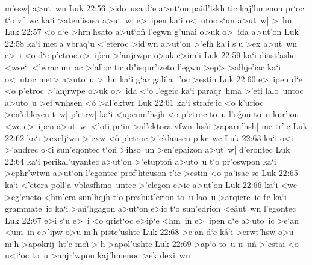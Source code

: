 m'esw|
a>ut~wn\bibvsend
\vs Luk 22:56
>ido~usa
d`e
a>ut`on
paid'iskh
tic
kaj'hmenon
pr`oc
t`o
vf~wc
ka`i
>aten'isasa
a>ut~w|
e>~ipen
ka`i
o<~utoc
s`un
a>ut~w|
>~hn\bibvsend
\vs Luk 22:57
<o
d`e
>hrn'hsato
a>ut`on\r{}
l'egwn
g'unai
o>uk
o>~ida
a>ut'on\bibvsend
\vs Luk 22:58
ka`i
met`a
vbraq`u
<'eteroc
>id`wn
a>ut`on
>'efh
ka`i
s`u
>ex
a>ut~wn
e>~i
<o
d`e
p'etroc
e>~i\r{p}en
>'anjrwpe
o>uk
e>im'i\bibvsend
\vs Luk 22:59
ka`i
diast'ashc
<wse`i
<'wrac
mi~ac
>'alloc
tic
di"isqur'izeto
l'egwn
>ep>
>alhje'iac
ka`i
o<~utoc
met>
a>uto~u
>~hn
ka`i
g`ar
galila~i'oc
>estin\bibvsend
\vs Luk 22:60
e>~ipen
d`e
<o
p'etroc
>'anjrwpe
o>uk
o>~ida
<`o
l'egeic
ka`i
paraqr~hma
>'eti
lalo~untoc
a>uto~u
>ef'wnhsen
<o\r{}
>al'ektwr\bibvsend
\vs Luk 22:61
ka`i
strafe`ic
<o
k'urioc
>en'ebleyen
t~w|
p'etrw|
ka`i
<upemn'hsjh
<o
p'etroc
to~u
l'o\r{g}ou
to~u
kur'iou
<wc
e>~ipen
a>ut~w|
<'oti
pr`in
>al'ektora
vfwn~hs\r{a}i
>aparn'hsh|
me
tr'ic\bibvsend
\vs Luk 22:62
ka`i
>exelj`wn
>'exw
<o\r{}
p'etroc
>'eklausen
pikr~wc\bibvsend
\vs Luk 22:63
ka`i
o<i
>'andrec
o<i
sun'eqontec
t`on\r{}
>ihso~un
>en'epaizon
a>ut~w|
d'erontec\bibvsend
\vs Luk 22:64
ka`i
perikal'uyantec
a>ut`on
>'etupton\r{}
a>uto~u
t`o
pr'oswpon
ka`i
>ephr'wtwn
a>ut`on
l'egontec
prof'hteuson
t'ic
>estin
<o
pa'isac
se\bibvsend
\vs Luk 22:65
ka`i
<'etera
poll`a
vblasfhmo~untec
>'elegon
e>ic
a>ut'on\bibvsend
\vs Luk 22:66
ka`i
<wc
>eg'eneto
<hm'era
sun'hqjh
t`o
presbut'erion
to~u
lao~u
>arqiere~ic
\r{t}e
ka`i
grammate~ic
ka`i
>a\r{n}'hgagon
a>ut`on
e>ic
t`o
sun'edrion
<e\r{a}ut~wn
l'egontec\bibvsend
\vs Luk 22:67
e>i
s`u
e>~i
<o
qrist`oc
e>i\r{p}`e
<hm~in
e>~ipen
d`e
a>uto~ic
>e`an
<um~in
e>'ipw
o>u
m`h
piste'ushte\bibvsend
\vs Luk 22:68
>e`an
d`e
k\r{a}`i
>erwt'hsw
o>u
m`h
>apokrij~ht'e
moi\r{}
>`h
>apol'ushte\bibvsend
\vs Luk 22:69
>ap`o
to~u
n~u\r{n}
>'estai
<o
u<i`oc
to~u
>anjr'wpou
kaj'hmenoc
>ek
dexi~wn
